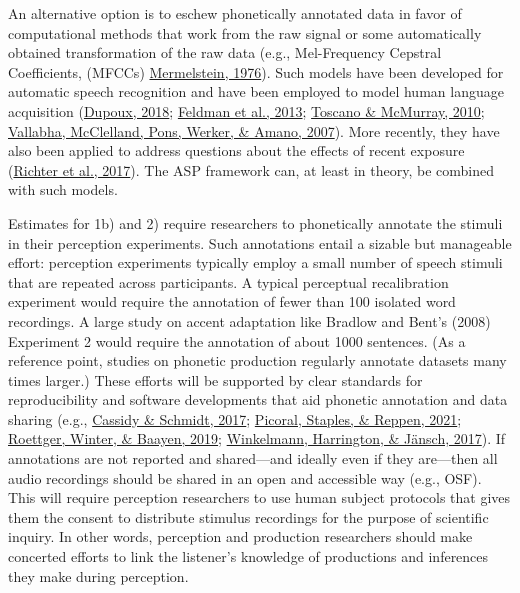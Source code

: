 \documentclass[
  11pt,
  english,
  man,floatsintext]{apa6}
\begin{document}
An alternative option is to eschew phonetically annotated data in favor of computational methods that work from the raw signal or some automatically obtained transformation of the raw data (e.g., Mel-Frequency Cepstral Coefficients, (MFCCs) \protect\hyperlink{ref-Mermelstein1976}{Mermelstein, 1976}). Such models have been developed for automatic speech recognition and have been employed to model human language acquisition (\protect\hyperlink{ref-dupoux2018}{Dupoux, 2018}; \protect\hyperlink{ref-feldman2013}{Feldman et al., 2013}; \protect\hyperlink{ref-toscano-mcmurray2010}{Toscano \& McMurray, 2010}; \protect\hyperlink{ref-vallabha2007}{Vallabha, McClelland, Pons, Werker, \& Amano, 2007}). More recently, they have also been applied to address questions about the effects of recent exposure (\protect\hyperlink{ref-richter2017}{Richter et al., 2017}). The ASP framework can, at least in theory, be combined with such models.

Estimates for 1b) and 2) require researchers to phonetically annotate the stimuli in their perception experiments. Such annotations entail a sizable but manageable effort: perception experiments typically employ a small number of speech stimuli that are repeated across participants. A typical perceptual recalibration experiment would require the annotation of fewer than 100 isolated word recordings. A large study on accent adaptation like Bradlow and Bent's (2008) Experiment 2 would require the annotation of about 1000 sentences. (As a reference point, studies on phonetic production regularly annotate datasets many times larger.) These efforts will be supported by clear standards for reproducibility and software developments that aid phonetic annotation and data sharing (e.g., \protect\hyperlink{ref-cassidy-schmidt2017}{Cassidy \& Schmidt, 2017}; \protect\hyperlink{ref-picoral2021}{Picoral, Staples, \& Reppen, 2021}; \protect\hyperlink{ref-roettger2019}{Roettger, Winter, \& Baayen, 2019}; \protect\hyperlink{ref-winkelmann2017}{Winkelmann, Harrington, \& Jänsch, 2017}). If annotations are not reported and shared---and ideally even if they are---then all audio recordings should be shared in an open and accessible way (e.g., OSF). This will require perception researchers to use human subject protocols that gives them the consent to distribute stimulus recordings for the purpose of scientific inquiry. In other words, perception and production researchers should make concerted efforts to link the listener's knowledge of productions and inferences they make during perception.
\end{document}
